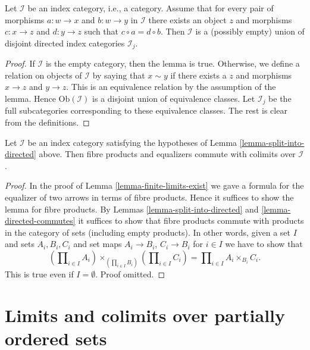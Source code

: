 \begin{lemma}
\label{lemma-split-into-directed}
Let $\mathcal{I}$ be an index category, i.e., a category.
Assume that for every pair of morphisms
$a : w \to x$ and $b : w \to y$ in $\mathcal{I}$
there exists an object $z$ and morphisms $c : x \to z$ and
$d : y \to z$ such that $c \circ a = d \circ b$.
Then $\mathcal{I}$ is a (possibly empty) union
of disjoint directed index categories $\mathcal{I}_j$.
\end{lemma}

\begin{proof}
If $\mathcal{I}$ is the empty category, then the lemma is true.
Otherwise, we define a relation on objects of $\mathcal{I}$ by
saying that $x \sim y$ if there exists a $z$ and
morphisms $x \to z$ and $y \to z$. This is an equivalence
relation by the assumption of the lemma. Hence $\text{Ob}(\mathcal{I})$
is a disjoint union of equivalence classes. Let $\mathcal{I}_j$
be the full subcategories corresponding to these equivalence classes.
The rest is clear from the definitions.
\end{proof}

\begin{lemma}
\label{lemma-almost-directed-commutes-equalizers}
Let $\mathcal{I}$ be an index category satisfying the hypotheses of
Lemma \ref{lemma-split-into-directed} above. Then fibre products and
equalizers commute with colimits over $\mathcal{I}$.
\end{lemma}

\begin{proof}
In the proof of Lemma \ref{lemma-finite-limits-exist} we gave a formula
for the equalizer of two arrows in terms of fibre products. Hence it suffices
to show the lemma for fibre products. By
Lemmas \ref{lemma-split-into-directed} and \ref{lemma-directed-commutes}
it suffices to show that fibre products commute with products in the category
of sets (including empty products). In other words, given a set $I$
and sets $A_i, B_i, C_i$ and set maps $A_i \to B_i$, $C_i \to B_i$
for $i \in I$ we have to show that
$$
(\prod\nolimits_{i \in I} A_i)\times_{(\prod\nolimits_{i \in I} B_i)}
(\prod\nolimits_{i \in I} C_i)
=
\prod\nolimits_{i \in I} A_i\times_{B_i} C_i.
$$
This is true even if $I = \emptyset$. Proof omitted.
\end{proof}



\section{Limits and colimits over partially ordered sets}
\label{section-posets-limits}

